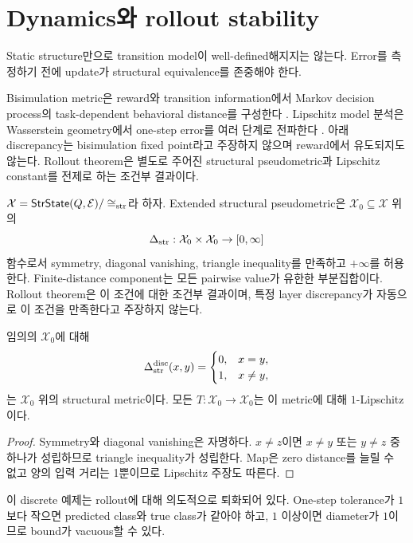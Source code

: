 \section{Dynamics와 rollout stability}

Static structure만으로 transition model이 well-defined해지지는 않는다. Error를
측정하기 전에 update가 structural equivalence를 존중해야 한다.

Bisimulation metric은 reward와 transition information에서 Markov decision
process의 task-dependent behavioral distance를 구성한다
\cite{ferns2004metrics}. Lipschitz model 분석은 Wasserstein geometry에서
one-step error를 여러 단계로 전파한다 \cite{asadi2018lipschitz}. 아래
discrepancy는 bisimulation fixed point라고 주장하지 않으며 reward에서 유도되지도
않는다. Rollout theorem은 별도로 주어진 structural pseudometric과 Lipschitz
constant를 전제로 하는 조건부 결과이다.

\begin{definition}
$\mathcal X=\mathsf{StrState}(Q,\mathcal E)/\cong_{\mathrm{str}}$라 하자. Extended
structural pseudometric은 $\mathcal X_0\subseteq\mathcal X$ 위의
\[
\Delta_{\mathrm{str}}:\mathcal X_0\times\mathcal X_0\to[0,\infty]
\]
함수로서 symmetry, diagonal vanishing, triangle inequality를 만족하고
$+\infty$를 허용한다. Finite-distance component는 모든 pairwise value가
유한한 부분집합이다. Rollout theorem은 이 조건에 대한 조건부 결과이며,
특정 layer discrepancy가 자동으로 이 조건을 만족한다고 주장하지 않는다.
\end{definition}

\begin{proposition}
임의의 $\mathcal X_0$에 대해
\[
\Delta_{\mathrm{str}}^{\mathrm{disc}}(x,y)=
\begin{cases}0,&x=y,\\1,&x\ne y,\end{cases}
\]
는 $\mathcal X_0$ 위의 structural metric이다. 모든
$T:\mathcal X_0\to\mathcal X_0$는 이 metric에 대해 $1$-Lipschitz이다.
\end{proposition}

\begin{proof}
Symmetry와 diagonal vanishing은 자명하다. $x\ne z$이면 $x\ne y$ 또는
$y\ne z$ 중 하나가 성립하므로 triangle inequality가 성립한다. Map은
zero distance를 늘릴 수 없고 양의 입력 거리는 1뿐이므로 Lipschitz 주장도
따른다.
\end{proof}

이 discrete 예제는 rollout에 대해 의도적으로 퇴화되어 있다. One-step tolerance가
$1$보다 작으면 predicted class와 true class가 같아야 하고, $1$ 이상이면 diameter가
$1$이므로 bound가 vacuous할 수 있다.

